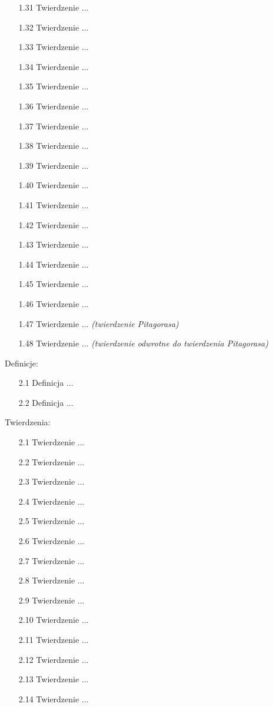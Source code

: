 \begin{enumerate}
\item [1.31] Twierdzenie ...
\item [1.32] Twierdzenie ...
\item [1.33] Twierdzenie ...
\item [1.34] Twierdzenie ...
\item [1.35] Twierdzenie ...
\item [1.36] Twierdzenie ...
\item [1.37] Twierdzenie ...
\item [1.38] Twierdzenie ...
\item [1.39] Twierdzenie ...
\item [1.40] Twierdzenie ...
\item [1.41] Twierdzenie ...
\item [1.42] Twierdzenie ...
\item [1.43] Twierdzenie ...
\item [1.44] Twierdzenie ...
\item [1.45] Twierdzenie ...
\item [1.46] Twierdzenie ...
\item [1.47] Twierdzenie ... \hfill \emph{(twierdzenie Pitagorasa)}
\item [1.48] Twierdzenie ... \hfill \emph{(twierdzenie odwrotne do twierdzenia Pitagorasa)}
\end{enumerate}
Definicje: \begin{enumerate}
\item [2.1] Definicja ...
\item [2.2] Definicja ...
\end{enumerate} Twierdzenia: \begin{enumerate}
\item [2.1] Twierdzenie ...
\item [2.2] Twierdzenie ...
\item [2.3] Twierdzenie ...
\item [2.4] Twierdzenie ...
\item [2.5] Twierdzenie ...
\item [2.6] Twierdzenie ...
\item [2.7] Twierdzenie ...
\item [2.8] Twierdzenie ...
\item [2.9] Twierdzenie ...
\item [2.10] Twierdzenie ...
\item [2.11] Twierdzenie ...
\item [2.12] Twierdzenie ...
\item [2.13] Twierdzenie ...
\item [2.14] Twierdzenie ...
\end{enumerate}

